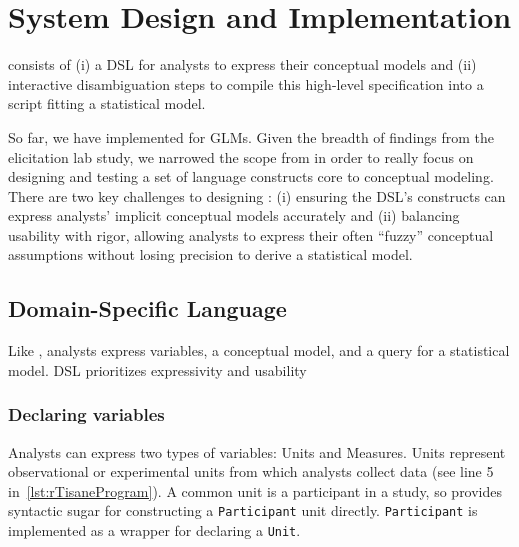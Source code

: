 \clearpage %
\rTisaneProgram
\section{System Design and Implementation} \label{sec:rTisane}

\rTisane consists of (i) a DSL for analysts to express their conceptual
models and (ii) interactive disambiguation steps to compile this high-level specification into a
script fitting a statistical model. 

So far, we have implemented \rTisane for GLMs. Given the breadth of findings
from the elicitation lab study, we narrowed the scope from \tisane in order to
really focus on designing and testing a set of language constructs core to
conceptual modeling. 
There are two key challenges to designing \rTisane: (i) ensuring the DSL's
constructs can express analysts' implicit conceptual models accurately and (ii) %
balancing usability with rigor, allowing
analysts to express their often ``fuzzy'' conceptual assumptions without losing
precision to derive a statistical model.

\def\Participant{\texttt{Participant}\xspace}
\def\Unit{\texttt{Unit}\xspace}
\def\Condition{\texttt{Condition}\xspace}
\def\Conditions{\texttt{Condition}s\xspace}

\subsection{\rTisanes Domain-Specific Language}
Like \tisane, analysts express variables, a conceptual model, and a query for a
statistical model. \rTisanes DSL prioritizes expressivity and usability 

\subsubsection{Declaring variables}
Analysts can express two types of variables: Units and Measures. Units represent
observational or experimental units from which analysts collect data (see line 5 in~\autoref{lst:rTisaneProgram}). 
A common unit is a participant in a study, so \rTisane provides syntactic sugar for
constructing a \Participant unit directly. \Participant is implemented as a wrapper for
declaring a \Unit.

